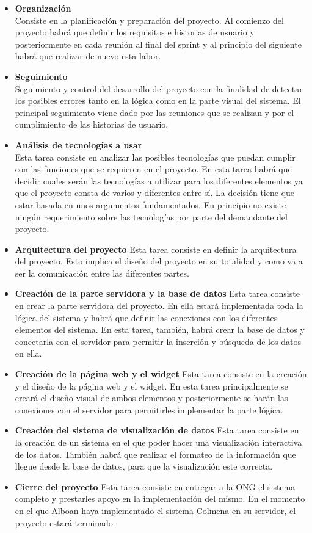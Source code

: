 \begin{itemize}
	\item \textbf{Organización}\\
	Consiste en la planificación y preparación del proyecto. Al comienzo del proyecto habrá que definir los requisitos e historias de usuario y posteriormente en cada reunión al final del sprint y al principio del siguiente habrá que realizar de nuevo esta labor.
	\item \textbf{Seguimiento}\\
	Seguimiento y control del desarrollo del proyecto con la finalidad de detectar los posibles errores tanto en la lógica como en la parte visual del sistema. El principal seguimiento viene dado por las reuniones que se realizan y por el cumplimiento de las historias de usuario.
	\item \textbf{Análisis de tecnologías a usar}\\
	Esta tarea consiste en analizar las posibles tecnologías que puedan cumplir con las funciones que se requieren en el proyecto. En esta tarea habrá que decidir cuales serán las tecnologías a utilizar para los diferentes elementos ya que el proyecto consta de varios y diferentes entre sí. La decisión tiene que estar basada en unos argumentos fundamentados. En principio no existe ningún requerimiento sobre las tecnologías por parte del demandante del proyecto.
	\item \textbf{Arquitectura del proyecto}\smallbreak
	Esta tarea consiste en definir la arquitectura del proyecto. Esto implica el diseño del proyecto en su totalidad y como va a ser la comunicación entre las diferentes partes.
	\item \textbf{Creación de la parte servidora y la base de datos}\smallbreak
	Esta tarea consiste en crear la parte servidora del proyecto. En ella estará implementada toda la lógica del sistema y habrá que definir las conexiones con los diferentes elementos del sistema. En esta tarea, también, habrá crear la base de datos y conectarla con el servidor para permitir la inserción y búsqueda de los datos en ella.
	\item \textbf{Creación de la página web y el widget}\smallbreak
	Esta tarea consiste en la creación y el diseño de la página web y el widget. En esta tarea principalmente se creará el diseño visual de ambos elementos y posteriormente se harán las conexiones con el servidor para permitirles implementar la parte lógica.
	\item \textbf{Creación del sistema de visualización de datos}\smallbreak
	Esta tarea consiste en la creación de un sistema en el que poder hacer una visualización interactiva de los datos. También habrá que realizar el formateo de la información que llegue desde la base de datos, para que la visualización este correcta.
	\item \textbf{Cierre del proyecto}\smallbreak
	Esta tarea consiste en entregar a la ONG el sistema completo y prestarles apoyo en la implementación del mismo. En el momento en el que Alboan haya implementado el sistema Colmena en su servidor, el proyecto estará terminado.
\end{itemize}


